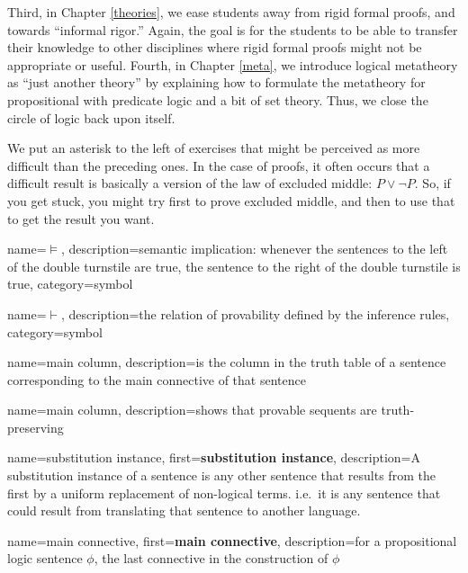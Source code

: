 \documentclass[fleqn]{tufte-book}
\renewcommand{\emph}{\textbf}
\numberwithin{prop}{chapter}
\theoremstyle{definition}
\numberwithin{exercise}{chapter}
\begin{document}
Third, in Chapter \ref{theories}, we ease students away from rigid
formal proofs, and towards ``informal rigor.''  Again, the goal is for
the students to be able to transfer their knowledge to other
disciplines where rigid formal proofs might not be appropriate or
useful.  Fourth, in Chapter \ref{meta}, we introduce logical
metatheory as ``just another theory'' by explaining how to formulate
the metatheory for propositional with predicate logic and a bit of set
theory.  Thus, we close the circle of logic back upon itself.

 We put an asterisk to the
left of exercises that might be perceived as more difficult than the
preceding ones.  In the case of proofs, it often occurs that a
difficult result is basically a version of the law of excluded middle:
$P\vee \neg P$.  So, if you get stuck, you might try first to prove
excluded middle, and then to use that to get the result you want.

\mainmatter

{
  name={\ensuremath{\vDash}},%
  description={semantic implication: whenever the sentences to the
    left of the double turnstile are true, the sentence to the right
    of the double turnstile is true},%
  category=symbol%
}

{
  name={\ensuremath{\vdash}},%
  description={the relation of provability defined by the inference rules},%
  category=symbol%
} 

{
  name={main column},
  description={is the column in the truth table of a sentence corresponding to the main connective of that sentence}
}

{
  name={main column},
  description={shows that provable sequents are truth-preserving}
} 

{
  name={substitution instance}, first={\emph{substitution instance}},
  description={A substitution instance of a sentence is any other
    sentence that results from the first by a uniform replacement of
    non-logical terms.  i.e.\ it is any sentence that could result
    from translating that sentence to another language.}
}

 { name={main connective},
  first={\emph{main connective}}, description={for a propositional
    logic sentence $\phi$, the last connective in the construction of
    $\phi$}}
\end{document}
